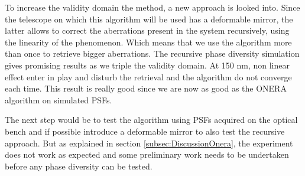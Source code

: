 To increase the validity domain the method, a new approach is looked into. Since the telescope on which this algorithm will be used has a deformable mirror, the latter allows to correct the aberrations present in the system recursively, using the linearity of the phenomenon. Which means that we use the algorithm more than once to retrieve bigger aberrations. The recursive phase diversity simulation gives promising results as we triple the validity domain. At 150 nm, non linear effect enter in play and disturb the retrieval and the algorithm do not converge each time. This result is really good since we are now as good as the ONERA algorithm on simulated PSFs.

The next step would be to test the algorithm using PSFs acquired on the optical bench and if possible introduce a deformable mirror to also test the recursive approach. But as explained in section \ref{subsec:DiscussionOnera}, the experiment does not work as expected and some preliminary work needs to be undertaken before any phase diversity can be tested.